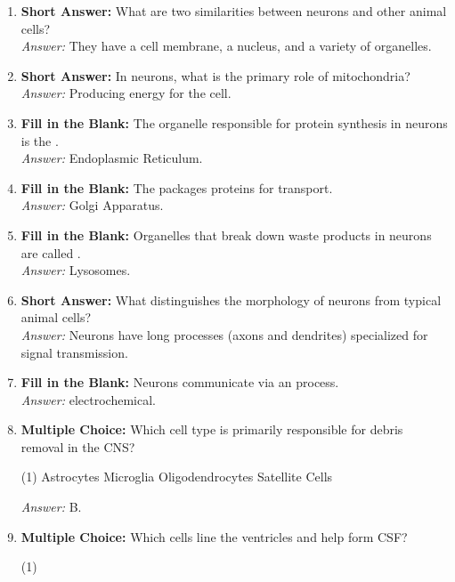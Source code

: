 \begin{enumerate}[label=\textbf{Q2.1.\arabic*}]
    \item \textbf{Short Answer:} What are two similarities between neurons and other animal cells? \\
          \textit{Answer:} They have a cell membrane, a nucleus, and a variety of organelles.
    \item \textbf{Short Answer:} In neurons, what is the primary role of mitochondria? \\
          \textit{Answer:} Producing energy for the cell.
    \item \textbf{Fill in the Blank:} The organelle responsible for protein synthesis in neurons is the \underline{\hspace{3cm}}. \\
          \textit{Answer:} Endoplasmic Reticulum.
    \item \textbf{Fill in the Blank:} The \underline{\hspace{3cm}} packages proteins for transport. \\
          \textit{Answer:} Golgi Apparatus.
    \item \textbf{Fill in the Blank:} Organelles that break down waste products in neurons are called \underline{\hspace{3cm}}. \\
          \textit{Answer:} Lysosomes.
    \item \textbf{Short Answer:} What distinguishes the morphology of neurons from typical animal cells? \\
          \textit{Answer:} Neurons have long processes (axons and dendrites) specialized for signal transmission.
    \item \textbf{Fill in the Blank:} Neurons communicate via an \underline{\hspace{3cm}} process. \\
          \textit{Answer:} electrochemical.
    \item \textbf{Multiple Choice:} Which cell type is primarily responsible for debris removal in the CNS? 
          \begin{tasks}[label=(\Alph*), label-width=1.5em, item-indent=1.7em](1)
               \task Astrocytes
               \task Microglia
               \task Oligodendrocytes
               \task Satellite Cells
          \end{tasks}
          \textit{Answer:} B.
    \item \textbf{Multiple Choice:} Which cells line the ventricles and help form CSF?
          \begin{tasks}[label=(\Alph*), label-width=1.5em, item-indent=1.7em](1)

\end{tasks}
\end{enumerate}
